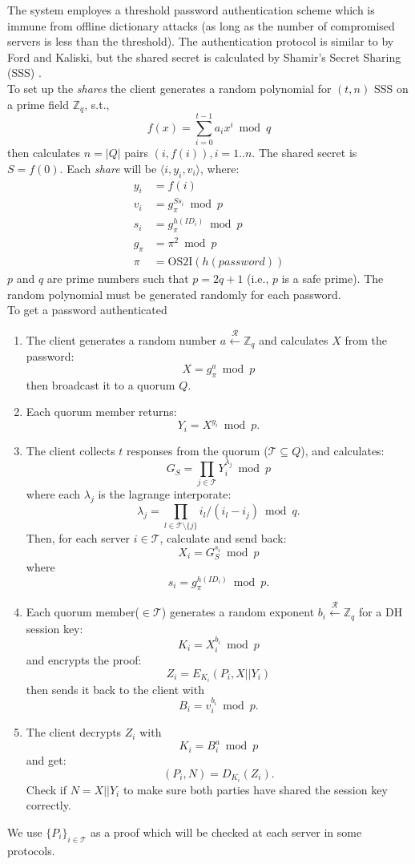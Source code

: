The system employes a threshold password authentication scheme which
is immune from offline dictionary attacks (as long as the number of
compromised servers is less than the threshold). The authentication
protocol is similar to \cite{ford} by Ford and Kaliski, but the shared
secret is calculated by Shamir's Secret Sharing (SSS) \cite{shamir}.\\

To set up the {\em shares} the client generates a random polynomial
for $(t, n)$ SSS on a prime field $\mathbb{Z}_q$, s.t.,
\[
  f(x) = \sum_{i=0}^{t-1}a_ix^i \bmod q
\]
then calculates $n=|Q|$ pairs $(i,f(i)), i = 1..n$. The shared secret
is $S = f(0)$. Each {\em share} will be $\langle i, y_i, v_i \rangle$,
where:
\begin{align*}
  y_i &= f(i) \\
  v_i &= g_{\pi}^{Ss_i} \bmod p \\
  s_i &= g_{\pi}^{h(ID_i)} \bmod p \\
  g_{\pi} &= \pi^2 \bmod p \\
  \pi &= \text{OS2I}(h(password))
\end{align*}
$p$ and $q$ are prime numbers such that $p = 2q + 1$ (i.e., $p$ is a
safe prime). The random polynomial must be generated randomly for each
password.\\

To get a password authenticated
\begin{enumerate}
\item The client generates a random number
  $a \xleftarrow{\mathcal{R}} \mathbb{Z}_q$
  and calculates $X$ from the password:
  \[
    X = g_{\pi}^a \bmod p
  \]
  then broadcast it to a quorum $Q$.

\item Each quorum member returns:
  \[
    Y_i = X^{y_i} \bmod p.
  \]

\item The client collects $t$ responses from the quorum ($\mathcal{T}
  \subseteq Q$), and
  calculates:
  \[
    G_S = \prod_{j \in \mathcal{T}}Y_i^{\lambda_j} \bmod p
  \]
  where each $\lambda_j$ is the lagrange interporate:
  \[
    \lambda_j = \prod_{l \in \mathcal{T} \setminus \{j\}}
    i_l / (i_l - i_j) \bmod q.
  \]
  Then, for each server $i \in \mathcal{T}$, calculate and send back:
  \[
    X_i = G_S^{s_i} \bmod p
  \]
  where
  \[
    s_i = g_{\pi}^{h(ID_i)} \bmod p.
  \]

\item Each quorum member($\in \mathcal{T}$) generates a random exponent
  $b_i \xleftarrow{\mathcal{R}} \mathbb{Z}_q$
  for a DH session key:
  \[ K_i = X_i^{b_i} \bmod p \]
  and encrypts the proof:
  \[
    Z_i = E_{K_i}(P_i, X || Y_i)
  \]
  then sends it back to the client with
  \[
    B_i = v_i^{b_i} \bmod p.
  \]

\item The client decrypts $Z_i$ with
  \[
    K_i = B_i^{a} \bmod p
  \]
  and get:
  \[
    (P_i, N) = D_{K_i}(Z_i).
  \]
  Check if $N = X||Y_i$ to make sure both parties have shared the
  session key correctly. 
\end{enumerate}
We use $\{P_i\}_{i \in \mathcal{T}}$ as a proof which will be
checked at each server in some protocols.

